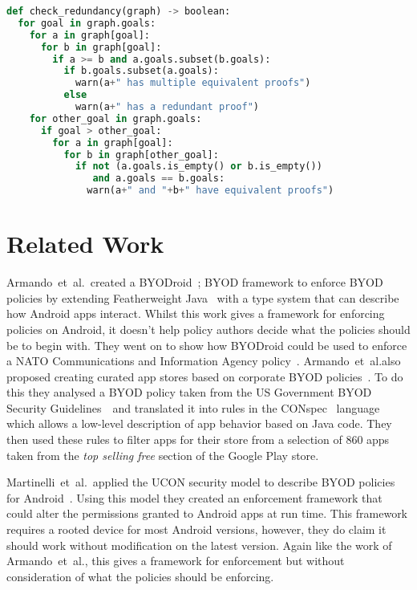 \documentclass[a4paper]{article}
\makeatletter
\newcommand{\etal}[0]{et~al{.}\@}
\makeatother
\begin{document}
\begin{lstlisting}[language=Python,float,caption={Procedure to check for redundancy.},label={alg:redundancy}]
def check_redundancy(graph) -> boolean:
  for goal in graph.goals:
    for a in graph[goal]:
      for b in graph[goal]:
        if a >= b and a.goals.subset(b.goals):
          if b.goals.subset(a.goals):
            warn(a+" has multiple equivalent proofs") 
          else
            warn(a+" has a redundant proof")
    for other_goal in graph.goals:
      if goal > other_goal:
        for a in graph[goal]:
          for b in graph[other_goal]:
            if not (a.goals.is_empty() or b.is_empty())
               and a.goals == b.goals:
              warn(a+" and "+b+" have equivalent proofs")
\end{lstlisting}

\section{Related Work}
\label{sec:related}

Armando~\etal~created a BYODroid~\cite{armando_bring_2013}; \ac{BYOD} framework
to enforce \ac{BYOD} policies by extending Featherweight
Java~\cite{igarashi_featherweight_2001} with a type system that can describe how
Android apps interact. Whilst this work gives a framework for enforcing policies
on Android, it doesn't help policy authors decide what the policies should be to
begin with. They went on to show how BYODroid could be used to enforce a {NATO}
Communications and Information Agency policy~\cite{armando_developing_2016}.
Armando~\etal also proposed creating curated app stores based on corporate BYOD
policies~\cite{armando_enabling_2014}. To do this they analysed a BYOD policy
taken from the US Government BYOD Security
Guidelines~\cite{digital_services_advisory_group_and_federal_chief_information_officers_council_bring_????}~and
translated it into rules in the CONspec~\cite{aktug_conspec_2008} language which
allows a low-level description of app behavior based on Java code. They then
used these rules to filter apps for their store from a selection of 860 apps
taken from the \emph{top selling free} section of the Google Play store.

Martinelli~\etal~applied the UCON security model to describe \ac{BYOD} policies
for Android~\cite{martinelli_enhancing_2016}. Using this model they created an
enforcement framework that could alter the permissions granted to Android apps
at run time. This framework requires a rooted device for most Android versions,
however, they do claim it should work without modification on the latest
version. Again like the work of Armando~\etal, this gives a framework for
enforcement but without consideration of what the policies should be enforcing.
\end{document}
